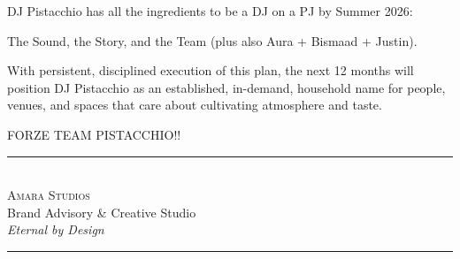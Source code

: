 \documentclass[11pt,a4paper]{article}
\begin{document}
\begin{center}
DJ Pistacchio has all the ingredients to be a DJ on a PJ by Summer 2026: \\

\vspace{0.5em}

The Sound, the Story, and the Team (plus also Aura + Bismaad + Justin). \\

\vspace{0.6em}

With persistent, disciplined execution of this plan, the next 12 months will position DJ Pistacchio as an established, in-demand, household name for people, venues, and spaces that care about cultivating atmosphere and taste.\\

\vspace{0.6em}

FORZE TEAM PISTACCHIO!!

\end{center}

\vspace{3em}

\begin{center}
{\textcolor{amaraprimary}{\rule{0.4\textwidth}{1.5pt}}}\\[1.2em]
{\large\textcolor{amaraprimary}{\textsc{Amara Studios}}}\\[0.4em]
{\small\textcolor{amaradark}{Brand Advisory \& Creative Studio}}\\[0.3em]
{\small\textit{\textcolor{amarasecondary}{Eternal by Design}}}\\[1.2em]
{\textcolor{amaraprimary}{\rule{0.4\textwidth}{1.5pt}}}
\end{center}
\end{document}
